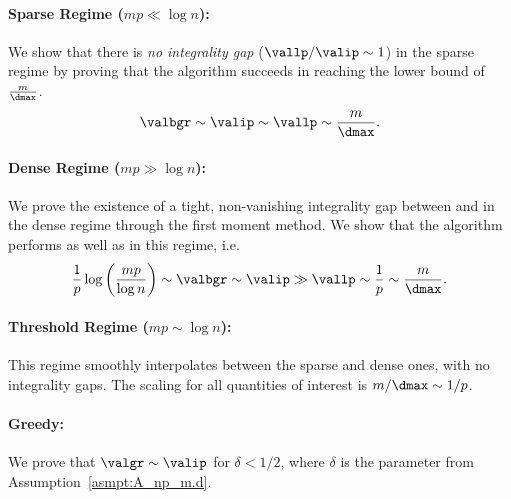 \noindent
\paragraph{\textbf{Sparse Regime} ($mp \ll \log{n}$):}
We show that there is \emph{no integrality gap} ($\vallp/\valip \sim 1$) in the sparse regime by proving that the \bgreedy algorithm succeeds in reaching the \lp lower bound of $\frac{m}{\dmax}$.
\[ \valbgr \sim \valip \sim \vallp \sim \frac{m}{\dmax}. \]

\vspace{0.3em}

\paragraph{\textbf{Dense Regime} ($mp \gg \log{n}$):}
We prove the existence of a tight, non-vanishing integrality gap between \ip and \lp in the dense regime through the first moment method. We show that the \bgreedy algorithm performs as well as \ip in this regime, i.e.
\[ \frac{1}{p} \log\left(\frac{mp}{\log n}\right) \sim \valbgr \sim \valip \gg \vallp \sim \frac{1}{p} \sim \frac{m}{\dmax}. \] 

\vspace{0.3em}

\paragraph{\textbf{Threshold Regime} ($mp \sim \log{n}$):} This regime smoothly interpolates between the sparse and dense ones, with no integrality gaps. The scaling for all quantities of interest is $m / \dmax \sim 1/p$.

\vspace{0.3em}

\paragraph{\textbf{Greedy}:} We prove that $\valgr \sim \valip$ for $\delta < 1/2$, where \(\delta\) is the parameter from Assumption~\ref{asmpt:A_np_m.d}. 
    
\vspace{1em}


